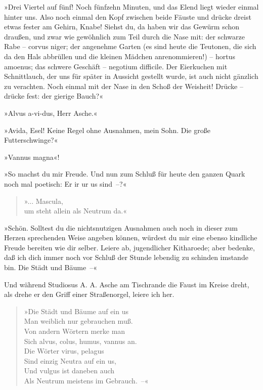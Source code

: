 »Drei Viertel auf fünf! Noch fünfzehn Minuten, und das Elend liegt
wieder einmal hinter uns. Also noch einmal den Kopf zwischen beide
Fäuste und drücke dreist etwas fester am Gehirn, Knabe! Siehst du,
da haben wir das Gewürm schon draußen, und zwar wie gewöhnlich zum
Teil durch die Nase mit: der schwarze Rabe – corvus niger; der
angenehme Garten (es sind heute die Teutonen, die sich da den Hals
abbrüllen und die kleinen Mädchen anrenommieren!) – hortus amoenus;
das schwere Geschäft – negotium difficile. Der Eierkuchen mit
Schnittlauch, der uns für später in Aussicht gestellt wurde, ist
auch nicht gänzlich zu verachten. Noch einmal mit der Nase in den
Schoß der Weisheit! Drücke – drücke fest: der gierige Bauch?«

»Alvus a-vi-dus, Herr Asche.«

»Avida, Esel! Keine Regel ohne Ausnahmen, mein Sohn. Die große
Futterschwinge?«

»Vannus magna«!

»So machst du mir Freude. Und nun zum Schluß für heute den ganzen
Quark noch mal poetisch: Er ir ur us sind~–?«

\begin{verse}
»... Mascula,\\
um steht allein als Neutrum da.«
\end{verse}

»Schön. Solltest du die nichtsnutzigen Ausnahmen auch noch in
dieser zum Herzen sprechenden Weise angeben können, würdest du mir
eine ebenso kindliche Freude bereiten wie dir selber. Leiere ab,
jugendlicher Kitharoede; aber bedenke, daß ich dich immer noch vor
Schluß der Stunde lebendig zu schinden imstande bin. Die Städt und
Bäume~–«

Und während Studiosus A. A. Asche am Tischrande die Faust im Kreise
dreht, als drehe er den Griff einer Straßenorgel, leiere ich her.

\begin{verse}
»Die Städt und Bäume auf ein us\\
Man weiblich nur gebrauchen muß.\\
Von andern Wörtern merke man\\
Sich alvus, colus, humus, vannus an.\\
Die Wörter virus, pelagus\\
Sind einzig Neutra auf ein us,\\
Und vulgus ist daneben auch\\
Als Neutrum meistens im Gebrauch.~–«
\end{verse}

